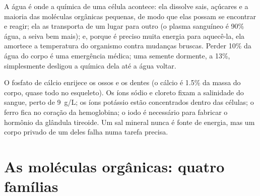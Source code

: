 \begin{proposition}\label{prop:g10:chemistry-of-life:water-roles}
A água é onde a química de uma célula acontece: ela dissolve sais,
açúcares e a maioria das moléculas orgânicas pequenas, de modo que elas
possam se encontrar e reagir; ela as transporta de um lugar para outro
(o plasma sanguíneo é 90\% água, a seiva bem mais); e, porque é preciso
muita energia para aquecê-la, ela amortece a temperatura do organismo
contra mudanças bruscas. Perder 10\% da água do corpo é uma emergência
médica; uma semente dormente, a 13\%, simplesmente desligou a química
dela até a água voltar.
\end{proposition}
\admitted

\begin{example}\label{ex:g10:chemistry-of-life:salts}
O fosfato de cálcio enrijece os ossos e os dentes (o cálcio é 1.5\% da
massa do corpo, quase todo no esqueleto). Os íons sódio e cloreto
fixam a salinidade do sangue, perto de \qty{9}{g/L}; os íons potássio
estão concentrados dentro das células; o ferro fica no coração da
hemoglobina; o iodo é necessário para fabricar o hormônio da glândula
tireoide. Um sal mineral nunca é fonte de energia, mas um corpo privado
de um deles falha numa tarefa precisa.
\end{example}

\section{As moléculas orgânicas: quatro famílias}

